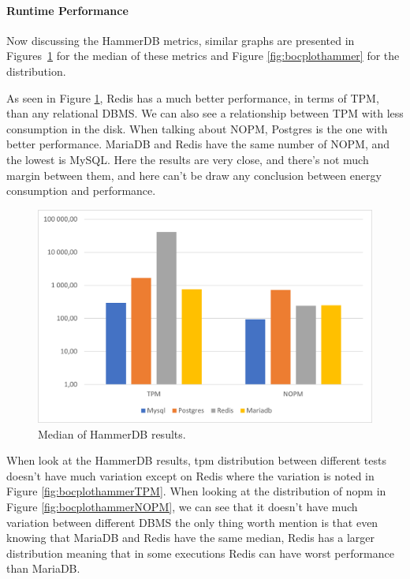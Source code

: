 
\paragraph{Runtime Performance}
Now discussing the HammerDB metrics, similar graphs are presented in Figures~\ref{fig:medianhammerdb} for the median of these metrics and Figure \ref{fig:bocplothammer} for the distribution.

As seen in Figure \ref{fig:medianhammerdb}, Redis has a much better performance, in terms of TPM, than any relational DBMS. We can also see a relationship between TPM with less consumption in the disk.
When talking about NOPM, Postgres is the one with better performance.
MariaDB and Redis have the same number of NOPM, and the lowest is MySQL. Here the results are very close, and there's not much margin between them, and here can't be draw any conclusion between energy consumption and performance.



\begin{figure}[H]
\centering
    \includegraphics[width=0.8\columnwidth]{results/median/hammerdb.png}
\caption{Median of HammerDB results.}
\label{fig:medianhammerdb}
\end{figure}


When look at the HammerDB results, \gls{tpm} distribution between different tests doesn't have much variation except on Redis where the variation is noted  in Figure \ref{fig:bocplothammerTPM}. 
When looking at the distribution of \gls{nopm} in Figure \ref{fig:bocplothammerNOPM}, we can see that it doesn't have much variation between different DBMS the only thing worth mention is that even knowing that MariaDB and Redis have the same median, Redis has a larger distribution meaning that in some executions Redis can have worst performance than MariaDB.

